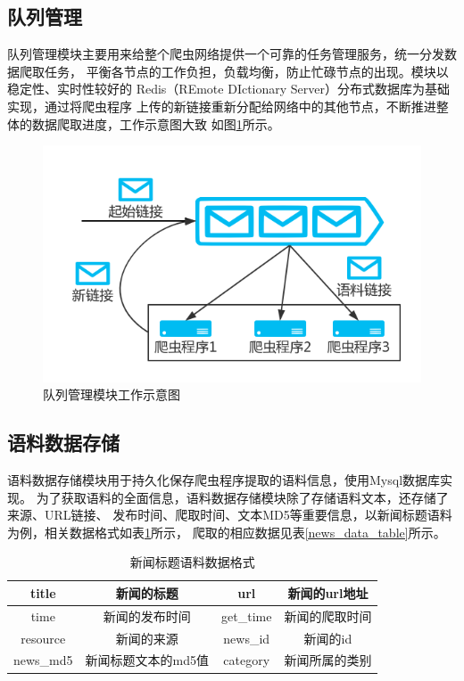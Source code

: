 \documentclass{standalone}
\begin{document}
\subsection{队列管理}
队列管理模块主要用来给整个爬虫网络提供一个可靠的任务管理服务，统一分发数据爬取任务，
平衡各节点的工作负担，负载均衡，防止忙碌节点的出现。模块以稳定性、实时性较好的
Redis（REmote DIctionary Server）分布式数据库为基础实现，通过将爬虫程序
上传的新链接重新分配给网络中的其他节点，不断推进整体的数据爬取进度，工作示意图大致
如图\ref{redis}所示。
\begin{figure}[h]
    \includegraphics[scale=0.5]{picture/redis.png}
    \caption{队列管理模块工作示意图}
    \label{redis}
\end{figure}
\subsection{语料数据存储}
语料数据存储模块用于持久化保存爬虫程序提取的语料信息，使用Mysql数据库实现。
为了获取语料的全面信息，语料数据存储模块除了存储语料文本，还存储了来源、URL链接、
发布时间、爬取时间、文本MD5等重要信息，以新闻标题语料为例，相关数据格式如表\ref{news_struct_table}所示，
爬取的相应数据见表\ref{news_data_table}所示。

\begin{table}[h]
    \caption{新闻标题语料数据格式}
    \begin{tabular}{|c|c|c|c|}
        \hline
        title & 新闻的标题 & url & 新闻的url地址 \\
        \hline
        time & 新闻的发布时间 & get\_time & 新闻的爬取时间 \\
        \hline
        resource & 新闻的来源 & news\_id & 新闻的id \\
        \hline
        news\_md5 & 新闻标题文本的md5值 & category & 新闻所属的类别  \\
        \hline
    \end{tabular}
    \label{news_struct_table}
    \end{table}
\end{document}
